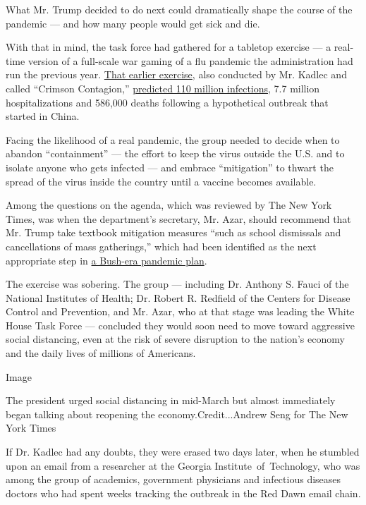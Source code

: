 What Mr. Trump decided to do next could dramatically shape the course of
the pandemic --- and how many people would get sick and die.

With that in mind, the task force had gathered for a tabletop exercise
--- a real-time version of a full-scale war gaming of a flu pandemic the
administration had run the previous year.
\href{https://www.nytimes3xbfgragh.onion/2020/03/19/us/politics/trump-coronavirus-outbreak.html}{That
earlier exercise}, also conducted by Mr. Kadlec and called ``Crimson
Contagion,''
\href{https://int.graylady3jvrrxbe.onion/data/documenthelper/6824-2019-10-key-findings-and-after/05bd797500ea55be0724/optimized/full.pdf\#page=18}{predicted
110 million infections}, 7.7 million hospitalizations and 586,000 deaths
following a hypothetical outbreak that started in China.

Facing the likelihood of a real pandemic, the group needed to decide
when to abandon ``containment'' --- the effort to keep the virus outside
the U.S. and to isolate anyone who gets infected --- and embrace
``mitigation'' to thwart the spread of the virus inside the country
until a vaccine becomes available.

Among the questions on the agenda, which was reviewed by The New York
Times, was when the department's secretary, Mr. Azar, should recommend
that Mr. Trump take textbook mitigation measures ``such as school
dismissals and cancellations of mass gatherings,'' which had been
identified as the next appropriate step in
\href{https://www.cdc.gov/flu/pandemic-resources/pdf/community_mitigation-sm.pdf}{a
Bush-era pandemic plan}.

The exercise was sobering. The group --- including Dr. Anthony S. Fauci
of the National Institutes of Health; Dr. Robert R. Redfield of the
Centers for Disease Control and Prevention, and Mr. Azar, who at that
stage was leading the White House Task Force --- concluded they would
soon need to move toward aggressive social distancing, even at the risk
of severe disruption to the nation's economy and the daily lives of
millions of Americans.

Image

The president urged social distancing in mid-March but almost
immediately began talking about reopening the economy.Credit...Andrew
Seng for The New York Times

If Dr. Kadlec had any doubts, they were erased two days later, when he
stumbled upon an email from a researcher at the Georgia
Institute~of~Technology, who was among the group of academics,
government physicians and infectious diseases doctors who had spent
weeks tracking the outbreak in the Red Dawn email chain.

